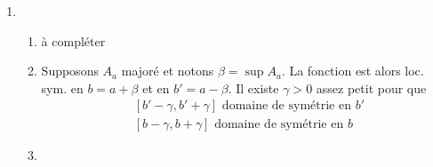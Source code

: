 \begin{enumerate}
  \item
  \begin{enumerate}
    \item à compléter
    \item Supposons $A_a$ majoré et notons $\beta = \sup A_a$. La fonction est alors loc. sym. en $b = a + \beta$ et en $b' = a - \beta$. Il existe $\gamma >0$ assez petit pour que 
\[
  \begin{aligned}
    &\left[ b' - \gamma ,b' + \gamma\right] \text{ domaine de symétrie en } b' \\
    &\left[ b - \gamma ,b + \gamma\right] \text{ domaine de symétrie en } b
  \end{aligned}
\]

    \item
  \end{enumerate}

\end{enumerate}
